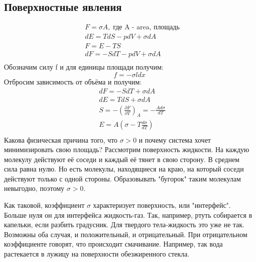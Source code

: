 \documentclass[a4paper, 12pt]{article}
\begin{document}
	\subsection{Поверхностные явления}
	\begin{equation*}
		\begin{aligned}
			& F = \sigma A, \; \text{где A - area, площадь} \\
			& dE = TdS - pdV+\sigma dA                                \\
			& F = E-TS                                                \\
			& dF = -SdT-pdV + \sigma dA                               \\
		\end{aligned}
	\end{equation*}
	Обозначим силу f и для единицы площади получим:
	\begin{equation*}
		f = - \sigma l dx
	\end{equation*}
	Отбросим зависимость от объёма и получим:
	\begin{equation*}
		\begin{aligned}
			& dF = -SdT + \sigma dA                                              \\
			& dE = TdS + \sigma dA                                               \\
			& S = -( \frac{\partial F}{\partial T})_{A} = - \frac{Ad \sigma}{dT} \\
			& E = A(\sigma - T \frac{d \sigma}{dT} )                             \\
		\end{aligned}
	\end{equation*}
	Какова физическая причина того, что $\sigma > 0$ и почему система хочет минимизировать свою площадь? Рассмотрим поверхность жидкости. На каждую молекулу действуют её соседи и каждый её тянет в свою сторону. В среднем сила равна нулю. Но есть молекулы, находящиеся на краю, на который соседи действуют только с одной стороны. Образовывать "бугорок" таким молекулам невыгодно, поэтому $\sigma > 0$. 
	
	Как таковой, коэффициент $\sigma$ характеризует поверхность, или "интерфейс". Больше нуля он для интерфейса жидкость-газ. Так, например, ртуть собирается в капельки, если разбить градусник. Для твердого тела-жидкость это уже не так. Возможны оба случая, и положительный, и отрицательный. При отрицательном коэффициенте говорят, что происходит смачивание. Например, так вода растекается в лужицу на поверхности обезжиренного стекла. 
	
\end{document}
